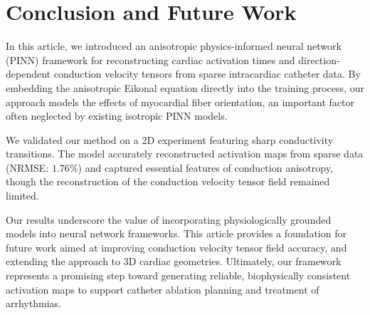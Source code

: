 \section{Conclusion and Future Work}

In this article, we introduced an anisotropic physics-informed neural network (PINN) framework for reconstructing cardiac activation times and direction-dependent conduction velocity tensors from sparse intracardiac catheter data. By embedding the anisotropic Eikonal equation directly into the training process, our approach models the effects of myocardial fiber orientation, an important factor often neglected by existing isotropic PINN models.

We validated our method on a 2D experiment featuring sharp conductivity transitions. The model accurately reconstructed activation maps from sparse data (NRMSE: $1.76\%$) and captured essential features of conduction anisotropy, though the reconstruction of the conduction velocity tensor field remained limited.

Our results underscore the value of incorporating physiologically grounded models into neural network frameworks. This article provides a foundation for future work aimed at improving conduction velocity tensor field accuracy, and extending the approach to 3D cardiac geometries. Ultimately, our framework represents a promising step toward generating reliable, biophysically consistent activation maps to support catheter ablation planning and treatment of arrhythmias.